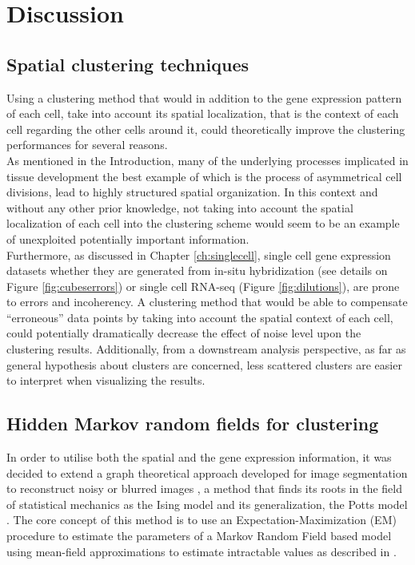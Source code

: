 \section{Discussion}
	\subsection{Spatial clustering techniques}
	Using a clustering method that would in addition to the gene expression pattern of each cell, take into account its spatial localization, that is the context of each cell regarding the other cells around it, could theoretically improve the clustering performances for several reasons.\\
	
	As mentioned in the Introduction, many of the underlying processes implicated in tissue development the best example of which is the process of asymmetrical cell divisions, lead to highly structured spatial organization. In this context and without any other prior knowledge, not taking into account the spatial localization of each cell into the clustering scheme would seem to be an example of unexploited potentially important information. \\
	
	Furthermore, as discussed in Chapter \ref{ch:singlecell}, single cell gene expression datasets whether they are generated from in-situ hybridization (see details on Figure \ref{fig:cubeserrors}) or single cell RNA-seq (Figure \ref{fig:dilutions}), are prone to errors and incoherency. A clustering method that would be able to compensate ``erroneous'' data points by taking into account the spatial context of each cell, could potentially dramatically decrease the effect of noise level upon the clustering results. Additionally, from a downstream analysis perspective, as far as general hypothesis about clusters are concerned, less scattered clusters are easier to interpret when visualizing the results.\\


	\subsection{Hidden Markov random fields for clustering}
In order to utilise both the spatial and the gene expression information, it was decided to extend a graph theoretical approach developed for image segmentation to reconstruct noisy or blurred images \citep{Dang98}, a method that finds its roots in the field of statistical mechanics as the Ising model \citep{Ising25} and its generalization, the Potts model \citep{Wu82}. The core concept of this method is to use an Expectation-Maximization (EM) procedure to estimate the parameters of a Markov Random Field based model using mean-field approximations to estimate intractable values as described in \citep{Celeux01}.\\

